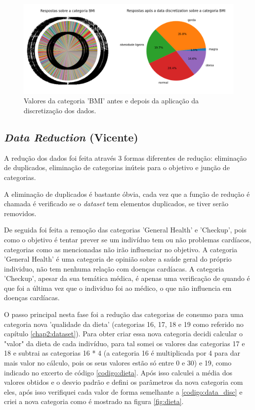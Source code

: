 \begin{figure}[H]
    \centering
    \includegraphics[scale=0.45]{BMI.png}
    \caption{Valores da categoria 'BMI' antes e depois da aplicação da discretização dos dados.}
    \label{fig:bmi}
\end{figure}


\subsection{\textit{Data Reduction} (Vicente)}
\label{chap3:data_redu}

A redução dos dados foi feita através 3 formas diferentes de redução: eliminação de duplicados, eliminação de categorias inúteis para o objetivo e junção de categorias.

A eliminação de duplicados é bastante óbvia, cada vez que a função de redução é chamada é verificado se o \textit{dataset} tem elementos duplicados, se tiver serão removidos.

De seguida foi feita a remoção das categorias 'General Health' e 'Checkup', pois como o objetivo é tentar prever se um indivíduo tem ou não problemas cardíacos, categorias como as mencionadas não irão influenciar no objetivo. A categoria 'General Health' é uma categoria de opinião sobre a saúde geral do próprio individuo, não tem nenhuma relação com doenças cardíacas. A categoria 'Checkup', apesar da sua temática médica, é apenas uma verificação de quando é que foi a última vez que o individuo foi ao médico, o que não influencia em doenças cardíacas.

O passo principal nesta fase foi a redução das categorias de consumo para uma categoria nova 'qualidade da dieta' (categorias 16, 17, 18 e 19 como referido no capítulo \ref{chap2:dataset}). Para obter criar essa nova categoria decidi calcular o "valor" da dieta de cada indivíduo, para tal somei os valores das categorias 17 e 18 e subtrai as categorias 16 * 4 (a categoria 16 é multiplicada por 4 para dar mais valor no cálculo, pois os seus valores estão só entre 0 e 30) e 19, como indicado no excerto de código \ref{codigo:dieta}. Após isso calculei a média dos valores obtidos e o desvio padrão e defini os parâmetros da nova categoria com eles, após isso verifiquei cada valor de forma semelhante a \ref{codigo:data_disc} e criei a nova categoria como é mostrado na figura \ref{fig:dieta}.

